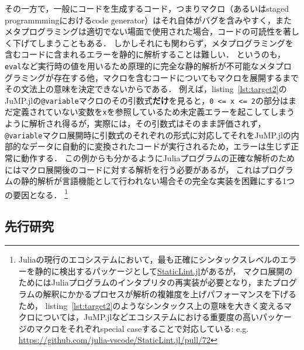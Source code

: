 その一方で，一般にコードを生成するコード，つまりマクロ（あるいはstaged programmmingにおけるcode generator）はそれ自体がバグを含みやすく，またメタプログラミングは適切でない場面で使用された場合，コードの可読性を著しく下げてしまうこともある．
しかしそれにも関わらず，メタプログラミングを含むコードに含まれるエラーを静的に解析することは難しい．
というのも，\texttt{eval}など実行時の値を用いるため原理的に完全な静的解析が不可能なメタプログラミングが存在する他，マクロを含むコードについてもマクロを展開するまでその文法上の意味を決定できないからである．
例えば，listing~\ref{lst:target2}のJuMP.jlの\texttt{@variable}マクロのその引数式\textbf{だけ}を見ると，\texttt{0 <= x <= 2}の部分はまだ定義されていない変数を\texttt{x}を参照しているため未定義エラーを起こしてしまうように解析され得るが，実際には，その引数式はそのまま評価されず，\texttt{@variable}マクロ展開時に引数式のそれぞれの形式に対応してそれをJuMP.jlの内部的なデータに自動的に変換されたコードが実行されるため，エラーは生じず正常に動作する．
この例からも分かるようにJuliaプログラムの正確な解析のためにはマクロ展開後のコードに対する解析を行う必要があるが，
これはプログラムの静的解析が言語機能として行われない場合その完全な実装を困難にする1つの要因となる．
\footnote{
  Juliaの現行のエコシステムにおいて，最も正確にシンタックスレベルのエラーを静的に検出するパッケージとして\href{https://github.com/julia-vscode/StaticLint.jl}{StaticLint.jl}があるが，
  マクロ展開のためにはJuliaプログラムのインタプリタの再実装が必要となり，またプログラムの解釈にかかるプロセスが解析の複雑度を上げパフォーマンスを下げるため，
  listing~\ref{lst:target2}のようなシンタックス上の意味を大きく変えるマクロについては，JuMP.jlなどエコシステムにおける重要度の高いパッケージのマクロをそれぞれspecial caseすることで対応している:
  e.g. \url{https://github.com/julia-vscode/StaticLint.jl/pull/72}
}


\subsection{先行研究}

